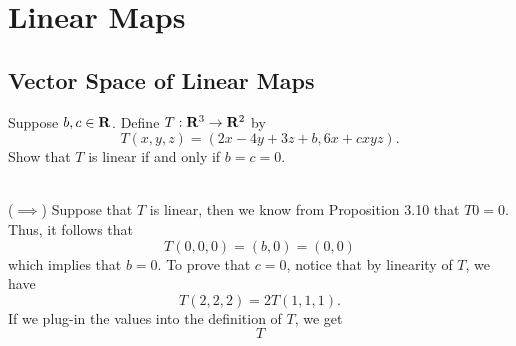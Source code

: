 \chapter{Linear Maps}

\section{Vector Space of Linear Maps}

\begin{exercise}
    Suppose $b,c \in \mathbf{R}$. Define $T: \mathbf{R}^3 \to \mathbf{R}^2$ by
    $$T(x,y,z) = (2x-4y + 3z + b, 6x + cxyz).$$
    Show that $T$ is linear if and only if $b = c = 0$. \\
\end{exercise}

\begin{solution}
    \\ ($\implies$) Suppose that $T$ is linear, then we know from Proposition 3.10 that $T0 = 0$. Thus, it follows that
    $$T(0,0,0) = (b, 0) = (0,0)$$
    which implies that $b = 0$. To prove that $c = 0$, notice that by linearity of $T$, we have
    $$T(2,2,2) = 2T(1,1,1).$$
    If we plug-in the values into the definition of $T$, we get
    $$T$$
    \td \\
\end{solution}